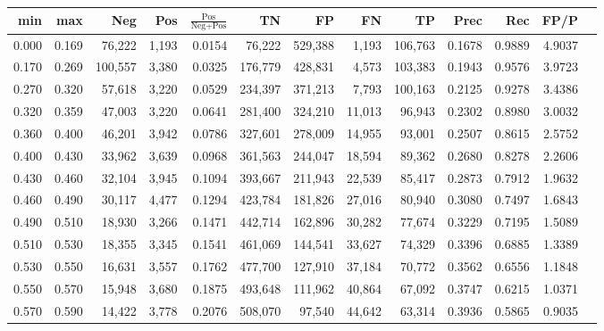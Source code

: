 \begin{tabular}{rrrrrrrrrrrrr}
\toprule
  min &   max &     Neg &   Pos & $\frac{\text{Pos}}{\text{Neg}+\text{Pos}}$ &      TN &      FP &      FN &      TP &   Prec &    Rec &   FP/P \\
\midrule
0.000 & 0.169 &  76,222 & 1,193 &                                     0.0154 &  76,222 & 529,388 &   1,193 & 106,763 & 0.1678 & 0.9889 & 4.9037 \\
0.170 & 0.269 & 100,557 & 3,380 &                                     0.0325 & 176,779 & 428,831 &   4,573 & 103,383 & 0.1943 & 0.9576 & 3.9723 \\
0.270 & 0.320 &  57,618 & 3,220 &                                     0.0529 & 234,397 & 371,213 &   7,793 & 100,163 & 0.2125 & 0.9278 & 3.4386 \\
0.320 & 0.359 &  47,003 & 3,220 &                                     0.0641 & 281,400 & 324,210 &  11,013 &  96,943 & 0.2302 & 0.8980 & 3.0032 \\
0.360 & 0.400 &  46,201 & 3,942 &                                     0.0786 & 327,601 & 278,009 &  14,955 &  93,001 & 0.2507 & 0.8615 & 2.5752 \\
0.400 & 0.430 &  33,962 & 3,639 &                                     0.0968 & 361,563 & 244,047 &  18,594 &  89,362 & 0.2680 & 0.8278 & 2.2606 \\
0.430 & 0.460 &  32,104 & 3,945 &                                     0.1094 & 393,667 & 211,943 &  22,539 &  85,417 & 0.2873 & 0.7912 & 1.9632 \\
0.460 & 0.490 &  30,117 & 4,477 &                                     0.1294 & 423,784 & 181,826 &  27,016 &  80,940 & 0.3080 & 0.7497 & 1.6843 \\
0.490 & 0.510 &  18,930 & 3,266 &                                     0.1471 & 442,714 & 162,896 &  30,282 &  77,674 & 0.3229 & 0.7195 & 1.5089 \\
0.510 & 0.530 &  18,355 & 3,345 &                                     0.1541 & 461,069 & 144,541 &  33,627 &  74,329 & 0.3396 & 0.6885 & 1.3389 \\
0.530 & 0.550 &  16,631 & 3,557 &                                     0.1762 & 477,700 & 127,910 &  37,184 &  70,772 & 0.3562 & 0.6556 & 1.1848 \\
0.550 & 0.570 &  15,948 & 3,680 &                                     0.1875 & 493,648 & 111,962 &  40,864 &  67,092 & 0.3747 & 0.6215 & 1.0371 \\
0.570 & 0.590 &  14,422 & 3,778 &                                     0.2076 & 508,070 &  97,540 &  44,642 &  63,314 & 0.3936 & 0.5865 & 0.9035 \\

\end{tabular}
